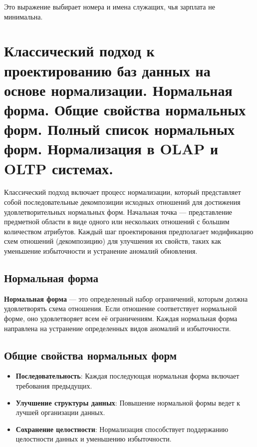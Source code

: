 \documentclass[a4paper,12pt]{article}
\begin{document}
Это выражение выбирает номера и имена служащих, чья зарплата не минимальна.










\section{Классический подход к проектированию баз данных на основе нормализации. Нормальная форма. Общие свойства нормальных форм. Полный список нормальных форм. Нормализация в OLAP и OLTP системах.}

Классический подход включает процесс нормализации, который представляет собой последовательные декомпозиции исходных отношений для достижения удовлетворительных нормальных форм. Начальная точка — представление предметной области в виде одного или нескольких отношений с большим количеством атрибутов. Каждый шаг проектирования предполагает модификацию схем отношений (декомпозицию) для улучшения их свойств, таких как уменьшение избыточности и устранение аномалий обновления.

\subsection{Нормальная форма}

\textbf{Нормальная форма} — это определенный набор ограничений, которым должна удовлетворять схема отношения. Если отношение соответствует нормальной форме, оно удовлетворяет всем её ограничениям. Каждая нормальная форма направлена на устранение определенных видов аномалий и избыточности.

\subsection{Общие свойства нормальных форм}

\begin{itemize}
    \item \textbf{Последовательность}: Каждая последующая нормальная форма включает требования предыдущих.
    \item \textbf{Улучшение структуры данных}: Повышение нормальной формы ведет к лучшей организации данных.
    \item \textbf{Сохранение целостности}: Нормализация способствует поддержанию целостности данных и уменьшению избыточности.
\end{itemize}
\end{document}
